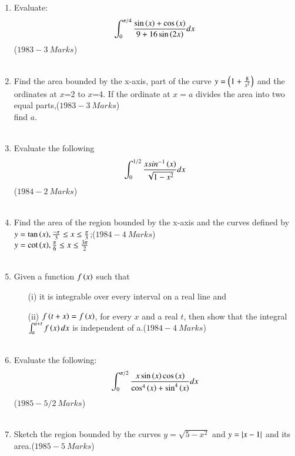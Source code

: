 \documentclass[journal,12pt,twocolumn]{IEEEtran}
\theoremstyle{remark}
\begin{document}
\begin{enumerate}
    \item Evaluate:\begin{align*}
         \int_{0}^{\pi/4}\frac{\sin{\ensuremath{\left(x\right)}}+\cos{\ensuremath{\left(x\right)}}}{9+16\sin{\ensuremath{\left(2x\right)}}}dx\end{align*} \hfill($1983-3\ Marks$)\\\\
	 \item Find the area bounded by the x-axis, part of the curve $y=\left(1+\frac{8}{x^2}\right)$ and the ordinates at $x$=2 to $x$=4. If the ordinate at $x=a$ divides the area into two equal parts,\hfill($1983-3\ Marks$)\\find $a$.\\\\
	 \item Evaluate the following\begin{align*}
	     \int_{0}^{1/2}\frac{xsin^-{}^1\left(x\right)}{\sqrt{1-x^2}}dx
	     \end{align*}\hfill($1984-2\ Marks$)\\\\
	     \item Find the area of the region bounded by the x-axis and the curves defined by $y=\tan{\ensuremath{\left(x\right)}}, \frac{-\pi}{3}\leq x \leq\frac{\pi}{3}$;\hfill($1984-4\ Marks$)\\$y=\cot{\ensuremath{\left(x\right)}}, \frac{\pi}{6}\leq x \leq\frac{3\pi}{2}$\\\\
	     \item Given a function $f\left(x\right)$ such that
		     \begin{enumerate}
			     \item[(i)]it is integrable over every interval on a real line and
		     \item[(ii)] $f\left(t+x\right)=f\left(x\right)$, for every $x$ and a real $t$, then show that the integral$\int_{a}^{a+t}f\left(x\right) dx$ is independent of a.\hfill($1984-4\ Marks$)\\\\
		     \end{enumerate}
	     \item Evaluate the following:\begin{align*}
	         \int_{0}^{\pi/2}\frac{x\sin{\ensuremath{\left(x
		     \right)}}\cos{\ensuremath{\left(x\right)}}}{\cos^4{\left(x\right)}+\sin^4{\left(x\right)}}dx
		     \end{align*}\hfill($1985-5/2\ Marks$)\\\\
		     \item Sketch the region bounded by the curves $y=\sqrt{5-x^2}$ and $y=\left\vert x-1\right\vert$ and its\\ area.\hfill($1985-5\ Marks$)\\\\

\end{enumerate}
\end{document}

